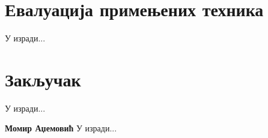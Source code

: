 \documentclass[11pt,oneside]{memoir}
\begin{document}
\chapter{Евалуација примењених техника}
\label{chp:razrada}

У изради...

\chapter{Закључак}
У изради...

\literatura

\backmatter

\begin{biografija}
\textbf{Момир Аџемовић} 
У изради...
\end{biografija}
\end{document}
